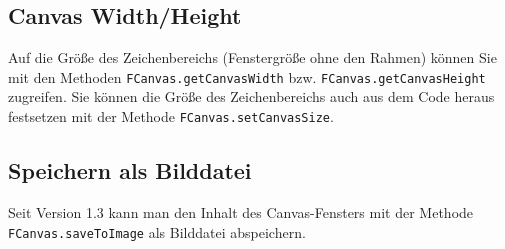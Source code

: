 \documentclass{article}
\begin{document}
\subsection{Canvas Width/Height}
Auf die Größe des Zeichenbereichs (Fenstergröße ohne den Rahmen) können Sie mit den Methoden {\tt FCanvas.getCanvasWidth} bzw. {\tt FCanvas.getCanvasHeight} zugreifen. Sie können die Größe des Zeichenbereichs auch aus dem Code heraus festsetzen mit der Methode {\tt FCanvas.setCanvasSize}.

\subsection{Speichern als Bilddatei}
Seit Version 1.3 kann man den Inhalt des Canvas-Fensters mit der Methode {\tt FCanvas.saveToImage} als Bilddatei abspeichern.
\end{document}

